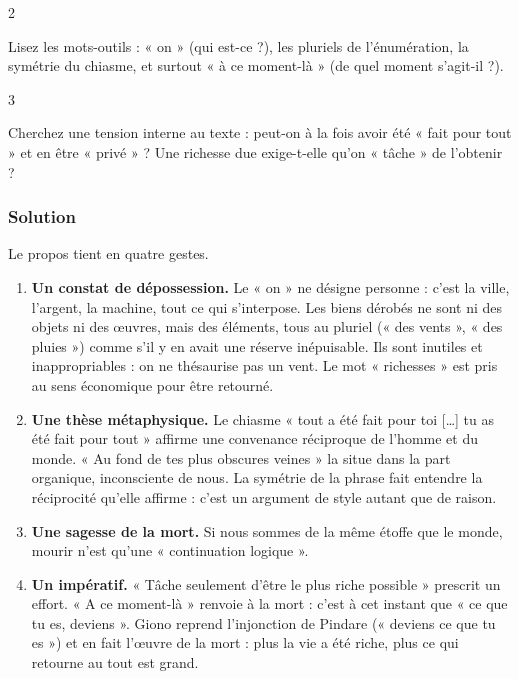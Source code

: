 \documentclass[11pt,a4paper]{article}
\providecommand{\tightlist}{\setlength{\itemsep}{0pt}\setlength{\parskip}{0pt}}
\begin{document}
\begin{indication}{2}

Lisez les mots-outils : « on » (qui est-ce ?), les pluriels de l'énumération, la symétrie du chiasme, et surtout « à ce moment-là » (de quel moment s'agit-il ?).

\end{indication}

\begin{indication}{3}

Cherchez une tension interne au texte : peut-on à la fois avoir été « fait pour tout » et en être « privé » ? Une richesse due exige-t-elle qu'on « tâche » de l'obtenir ?

\end{indication}

\hypertarget{solution}{%
\subsubsection{Solution}\label{solution}}

Le propos tient en quatre gestes.

\begin{enumerate}
\def\labelenumi{\arabic{enumi}.}
\tightlist
\item
  \textbf{Un constat de dépossession.} Le « on » ne désigne personne : c'est la ville, l'argent, la machine, tout ce qui s'interpose. Les biens dérobés ne sont ni des objets ni des œuvres, mais des éléments, tous au pluriel (« des vents », « des pluies ») comme s'il y en avait une réserve inépuisable. Ils sont inutiles et inappropriables : on ne thésaurise pas un vent. Le mot « richesses » est pris au sens économique pour être retourné.
\item
  \textbf{Une thèse métaphysique.} Le chiasme « tout a été fait pour toi {[}\ldots{]} tu as été fait pour tout » affirme une convenance réciproque de l'homme et du monde. « Au fond de tes plus obscures veines » la situe dans la part organique, inconsciente de nous. La symétrie de la phrase fait entendre la réciprocité qu'elle affirme : c'est un argument de style autant que de raison.
\item
  \textbf{Une sagesse de la mort.} Si nous sommes de la même étoffe que le monde, mourir n'est qu'une « continuation logique ».
\item
  \textbf{Un impératif.} « Tâche seulement d'être le plus riche possible » prescrit un effort. « A ce moment-là » renvoie à la mort : c'est à cet instant que « ce que tu es, deviens ». Giono reprend l'injonction de Pindare (« deviens ce que tu es ») et en fait l'œuvre de la mort : plus la vie a été riche, plus ce qui retourne au tout est grand.
\end{enumerate}
\end{document}
